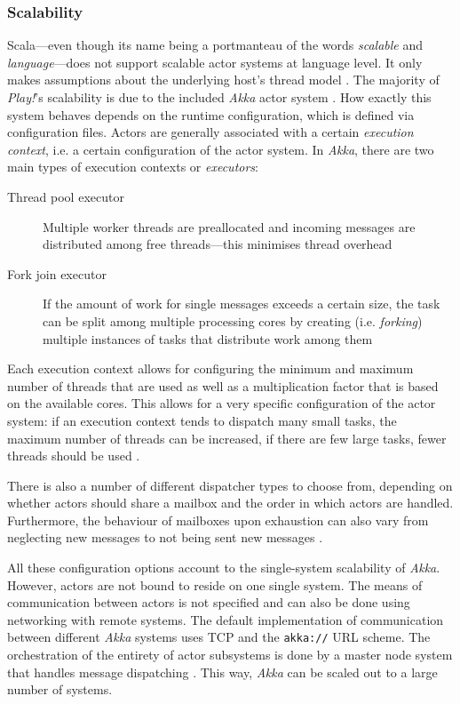 \subsubsection*{Scalability}
Scala---even though its name being a portmanteau of the words \textit{scalable} and \textit{language}---does not support scalable actor systems at language level. It only makes assumptions about the underlying host's thread model \cite[p. 3]{Haller2009}. The majority of \textit{Play!}'s scalability is due to the included \textit{Akka} actor system \cite[p. 16]{Gupta2012}. How exactly this system behaves depends on the runtime configuration, which is defined via configuration files. Actors are generally associated with a certain \textit{execution context}, i.e. a certain configuration of the actor system. In \textit{Akka}, there are two main types of execution contexts or \textit{executors}:

\begin{description}
  \item[Thread pool executor] Multiple worker threads are preallocated and incoming messages are distributed among free threads---this minimises thread overhead
  \item[Fork join executor] If the amount of work for single messages exceeds a certain size, the task can be split among multiple processing cores by creating (i.e. \textit{forking}) multiple instances of tasks that distribute work among them
\end{description}

Each execution context allows for configuring the minimum and maximum number of threads that are used as well as a multiplication factor that is based on the available cores. This allows for a very specific configuration of the actor system: if an execution context tends to dispatch many small tasks, the maximum number of threads can be increased, if there are few large tasks, fewer threads should be used \cite[p. 105]{Gupta2012}.

There is also a number of different dispatcher types to choose from, depending on whether actors should share a mailbox and the order in which actors are handled. Furthermore, the behaviour of mailboxes upon exhaustion can also vary from neglecting new messages to not being sent new messages \cite[p. 104]{Gupta2012}. 

All these configuration options account to the single-system scalability of \textit{Akka}. However, actors are not bound to reside on one single system. The means of communication between actors is not specified and can also be done using networking with remote systems. The default implementation of communication between different \textit{Akka} systems uses TCP and the \texttt{akka://} URL scheme. The orchestration of the entirety of actor subsystems is done by a master node system that handles message dispatching \cite[p. 233]{Gupta2012}. This way, \textit{Akka} can be scaled out to a large number of systems.

